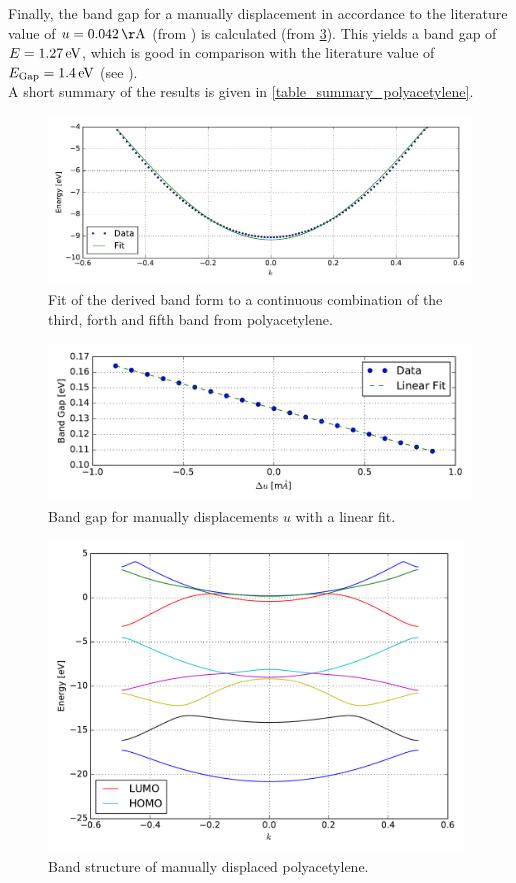 Finally, the band gap for a manually displacement in accordance to the literature value of $u = \unit[0.042]{\AA}$ (from \cite{PhysRevLett.42.1698, doi:10.1021/cr990357p}) is calculated (from \cref{image_manually_displaced_poly_bandstructure}). This yields a band gap of $E = \unit[1.27]{eV}$, which is good in comparison with the literature value of $E_\text{Gap} = \unit[1.4]{eV}$ (see \cite{PhysRevLett.42.1698}).\\
A short summary of the results is given in \cref{table_summary_polyacetylene}.\\
\begin{figure}
	\centering
	\includegraphics[width = 13cm]{Images/polyacetylene/bands/band_fit}
	\caption{Fit of the derived band form to a continuous combination of the third, forth and fifth band from polyacetylene.}
	\label{image_band_fit_t0}
\end{figure}
\begin{figure}
	\centering
	\includegraphics[width = 13cm]{Images/polyacetylene/bands/alpha}
	\caption{Band gap for manually displacements $u$ with a linear fit.}
	\label{image_alpha_fit}
\end{figure}
\begin{figure}
	\centering
	\includegraphics[width = 11cm]{Images/polyacetylene/bands/bandstructure_manually_displaced}
	\caption{Band structure of manually displaced polyacetylene.}
	\label{image_manually_displaced_poly_bandstructure}
\end{figure}

